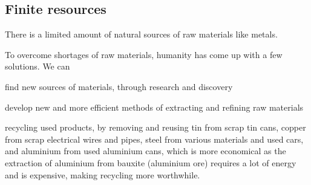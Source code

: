 \documentclass[Chemistry.tex]{subfiles}
\begin{document}
\subsection{Finite resources}
There is a limited amount of natural sources of raw materials like metals.

To overcome shortages of raw materials, humanity has come up with a few solutions. We can
\begin{slinenum}
\item find new sources of materials, through research and discovery
\item develop new and more efficient methods of extracting and refining raw materials
\item recycling used products, by removing and reusing tin from scrap tin cans, copper from scrap electrical wires and pipes, steel from various materials and used cars, and aluminium from used aluminium cans, which is more economical as the extraction of aluminium from bauxite (aluminium ore) requires a lot of energy and is expensive, making recycling more worthwhile.
\end{slinenum}
\end{document}
